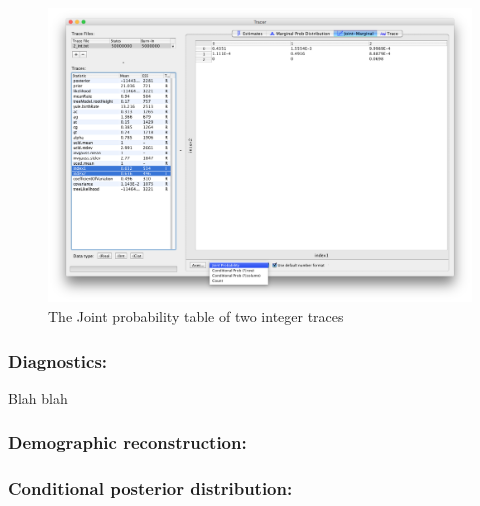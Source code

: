 \documentclass{bioinfo}
\begin{document}
\begin{figure}[H]
\includegraphics[width=.5\textwidth]{./figures/jointPrInt.png}  
\caption{The Joint probability table of two integer traces}
\label{fig:int:jointpr}
\end{figure}



\subsubsection*{Diagnostics:} Blah blah 

\subsubsection*{Demographic reconstruction:} 


\subsubsection*{Conditional posterior distribution:}
\end{document}
